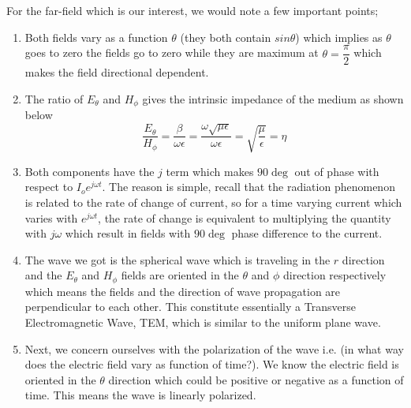 For the far-field which is our interest, we would note a few important points;
\begin{enumerate}
\item Both fields vary as a function $\theta$ (they both contain $sin\theta$) which implies as $\theta$ goes to zero the fields go to zero while they are maximum at $\theta = \dfrac{\pi}{2}$ which makes the field directional dependent. 
\item The ratio of $E_{\theta}$ and  $H_{\phi}$ gives the intrinsic impedance of the medium as shown below
$$\dfrac{E_{\theta}}{H_{\phi}} = \dfrac{\beta}{\omega  \epsilon} = \dfrac{\omega \sqrt{\mu \epsilon}}{\omega  \epsilon} = \sqrt{\dfrac{\mu}{\epsilon}} = \eta $$
\item Both components have the $j$ term which makes $90\deg$ out of phase with respect to $I_oe^{j\omega t}$. The reason is simple, recall that the radiation phenomenon is related to the rate of change of current, so for a time varying current which varies with $e^{j\omega t}$, the rate of change is equivalent to multiplying the quantity with $j\omega $ which result in fields with $90\deg$ phase difference to the current.
\item The wave we got is the spherical wave which is traveling in the $r$ direction and the $E_\theta$ and $H_\phi$ fields are oriented in the $\theta$ and $\phi$ direction respectively which means the fields and the direction of wave propagation are perpendicular to each other. This constitute essentially a Transverse Electromagnetic Wave, TEM, which is similar to the uniform plane wave.
\item Next, we concern ourselves with the polarization of the wave i.e. (in what way does the electric field vary as function of time?). We know the electric field is oriented in the $\theta$ direction which could be positive or negative as a function of time. This means the wave is linearly polarized.
\end{enumerate}